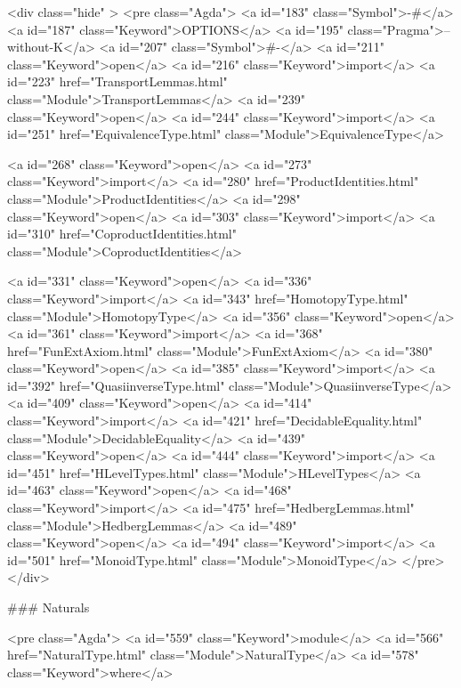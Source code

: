   <div class="hide" >
<pre class="Agda">
<a id="183" class="Symbol">{-#</a> <a id="187" class="Keyword">OPTIONS</a> <a id="195" class="Pragma">--without-K</a> <a id="207" class="Symbol">#-}</a>
<a id="211" class="Keyword">open</a> <a id="216" class="Keyword">import</a> <a id="223" href="TransportLemmas.html" class="Module">TransportLemmas</a>
<a id="239" class="Keyword">open</a> <a id="244" class="Keyword">import</a> <a id="251" href="EquivalenceType.html" class="Module">EquivalenceType</a>

<a id="268" class="Keyword">open</a> <a id="273" class="Keyword">import</a> <a id="280" href="ProductIdentities.html" class="Module">ProductIdentities</a>
<a id="298" class="Keyword">open</a> <a id="303" class="Keyword">import</a> <a id="310" href="CoproductIdentities.html" class="Module">CoproductIdentities</a>

<a id="331" class="Keyword">open</a> <a id="336" class="Keyword">import</a> <a id="343" href="HomotopyType.html" class="Module">HomotopyType</a>
<a id="356" class="Keyword">open</a> <a id="361" class="Keyword">import</a> <a id="368" href="FunExtAxiom.html" class="Module">FunExtAxiom</a>
<a id="380" class="Keyword">open</a> <a id="385" class="Keyword">import</a> <a id="392" href="QuasiinverseType.html" class="Module">QuasiinverseType</a>
<a id="409" class="Keyword">open</a> <a id="414" class="Keyword">import</a> <a id="421" href="DecidableEquality.html" class="Module">DecidableEquality</a>
<a id="439" class="Keyword">open</a> <a id="444" class="Keyword">import</a> <a id="451" href="HLevelTypes.html" class="Module">HLevelTypes</a>
<a id="463" class="Keyword">open</a> <a id="468" class="Keyword">import</a> <a id="475" href="HedbergLemmas.html" class="Module">HedbergLemmas</a>
<a id="489" class="Keyword">open</a> <a id="494" class="Keyword">import</a> <a id="501" href="MonoidType.html" class="Module">MonoidType</a>
</pre>
</div>


### Naturals

<pre class="Agda">
<a id="559" class="Keyword">module</a> <a id="566" href="NaturalType.html" class="Module">NaturalType</a> <a id="578" class="Keyword">where</a>

